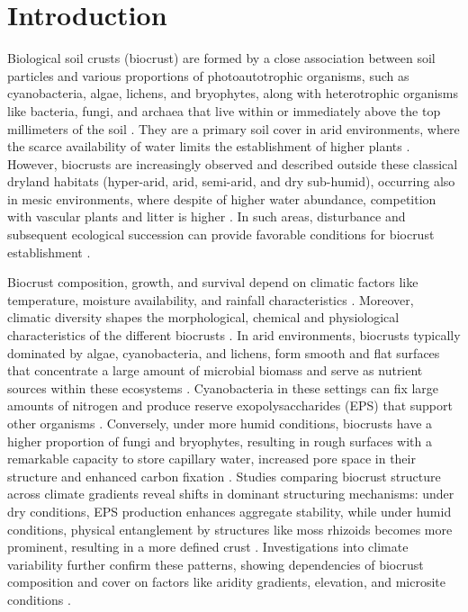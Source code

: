 \section{Introduction}

Biological soil crusts (biocrust) are formed by a close association between soil particles and various proportions of photoautotrophic organisms, such as cyanobacteria, algae, lichens, and bryophytes, along with heterotrophic organisms like bacteria, fungi, and archaea that live within or immediately above the top millimeters of the soil \citep{Weber2022}. They are a primary soil cover in arid environments, where the scarce availability of water limits the establishment of higher plants \citep{Ding2020,Weber2022}. However, biocrusts are increasingly observed and described outside these classical dryland habitats (hyper-arid, arid, semi-arid, and dry sub-humid), occurring also in mesic environments, where despite of higher water abundance, competition with vascular plants and litter is higher \citep{Corbin2020,Gall2022a}. In such areas, disturbance and subsequent ecological succession can provide favorable conditions for biocrust establishment \citep{Budel2014,Gall2022a}.

Biocrust composition, growth, and survival depend on climatic factors like temperature, moisture availability, and rainfall characteristics \citep{Belnap2003}. Moreover, climatic diversity shapes the morphological, chemical and physiological characteristics of the different biocrusts \citep{ConcostrinaZubiri2014}. In arid environments, biocrusts typically dominated by algae, cyanobacteria, and lichens, form smooth and flat surfaces that concentrate a large amount of microbial biomass and serve as nutrient sources within these ecosystems \citep{Weber2022}. Cyanobacteria in these settings can fix large amounts of nitrogen and produce reserve exopolysaccharides (EPS) that support other organisms \citep{RodriguezCaballero2018,Samolov2020}. Conversely, under more humid conditions, biocrusts have a higher proportion of fungi and bryophytes, resulting in rough surfaces with a remarkable capacity to store capillary water, increased pore space in their structure and enhanced carbon fixation \citep{Riveras-Munoz2022,Weber2022}. Studies comparing biocrust structure across climate gradients reveal shifts in dominant structuring mechanisms: under dry conditions, EPS production enhances aggregate stability, while under humid conditions, physical entanglement by structures like moss rhizoids becomes more prominent, resulting in a more defined crust \citep{Riveras-Munoz2022}. Investigations into climate variability further confirm these patterns, showing dependencies of biocrust composition and cover on factors like aridity gradients, elevation, and microsite conditions \citep{CastilloMonroy2016,Ding2020,Munoz-Martin2019}.

